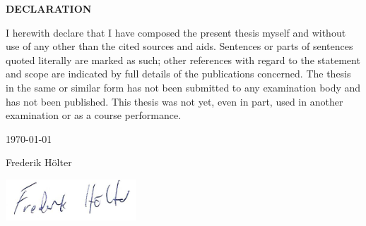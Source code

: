 \begin{center}
    \textbf{DECLARATION}
\end{center}

I herewith declare that I have composed the present thesis myself and without use of any other than the
cited sources and aids. Sentences or parts of sentences quoted literally are marked as such; other references
with regard to the statement and scope are indicated by full details of the publications concerned. The thesis
in the same or similar form has not been submitted to any examination body and has not been published.
This thesis was not yet, even in part, used in another examination or as a course performance.\\

\begin{center}
    \today\\
\end{center}

\begin{center}
    Frederik Hölter\\
\end{center}

\begin{center}
    \includegraphics*[scale=0.7]{graphics/Unterschrift sized.png}
\end{center}